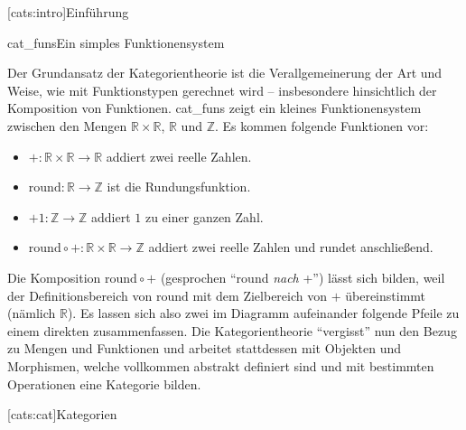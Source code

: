 \documentclass[12pt, a4paper, bibgerm]{scrbook}
\newcommand\lsection{}
\newcommand\abb{}
\newcommand\fig{}
\newcommand\ato{\rightarrow} %
\begin{document}
\lsection[cats:intro]{Einführung}

\fig{cat_funs}{Ein simples Funktionensystem}

Der Grundansatz der Kategorientheorie ist die Verallgemeinerung der
Art und Weise, wie mit Funktionstypen gerechnet wird -- insbesondere
hinsichtlich der Komposition von Funktionen. \abb{cat_funs} zeigt ein
kleines Funktionensystem zwischen den Mengen $\mathbb{R} \times
\mathbb{R}$, $\mathbb{R}$ und $\mathbb{Z}$. Es kommen folgende
Funktionen vor:
\begin{itemize}
\item $+ : \mathbb{R} \times \mathbb{R} \ato \mathbb{R}$ addiert zwei
  reelle Zahlen.
\item $\mathrm{round} : \mathbb{R} \ato \mathbb{Z}$ ist die
  Rundungsfunktion.
\item $+1 : \mathbb{Z} \ato \mathbb{Z}$ addiert $1$ zu einer ganzen Zahl.
\item $\mathrm{round} \circ + : \mathbb{R} \times \mathbb{R} \ato \mathbb{Z}$
  addiert zwei reelle Zahlen und rundet anschließend.
\end{itemize}

Die Komposition $\mathrm{round} \circ +$ (gesprochen "`round \textit{nach}
+"') lässt sich bilden, weil der Definitionsbereich von $\mathrm{round}$
mit dem Zielbereich von $+$ übereinstimmt (nämlich $\mathbb{R}$). Es
lassen sich also zwei im Diagramm aufeinander folgende Pfeile zu einem
direkten zusammenfassen. Die Kategorientheorie "`vergisst"' nun den
Bezug zu Mengen und Funktionen und arbeitet stattdessen mit Objekten
und Morphismen, welche vollkommen abstrakt definiert sind und mit
bestimmten Operationen eine Kategorie bilden.

\lsection[cats:cat]{Kategorien}
\end{document}
